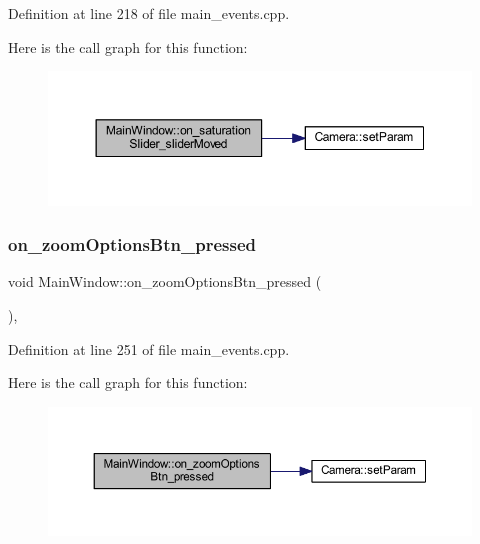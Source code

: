 Definition at line 218 of file main\+\_\+events.\+cpp.

Here is the call graph for this function\+:
\nopagebreak
\begin{figure}[H]
\begin{center}
\leavevmode
\includegraphics[width=350pt]{class_main_window_abd0b71ebb4667aa574bfa870ade22f58_cgraph}
\end{center}
\end{figure}
\mbox{\label{class_main_window_aaf176f5c10001cdcf845f1250232be9a}} 
\subsubsection{\texorpdfstring{on\_zoomOptionsBtn\_pressed}{on\_zoomOptionsBtn\_pressed}}
{\footnotesize\ttfamily void Main\+Window\+::on\+\_\+zoom\+Options\+Btn\+\_\+pressed (\begin{DoxyParamCaption}{ }\end{DoxyParamCaption})\hspace{0.3cm}{\ttfamily [private]}, {\ttfamily [slot]}}



Definition at line 251 of file main\+\_\+events.\+cpp.

Here is the call graph for this function\+:
\nopagebreak
\begin{figure}[H]
\begin{center}
\leavevmode
\includegraphics[width=350pt]{class_main_window_aaf176f5c10001cdcf845f1250232be9a_cgraph}
\end{center}
\end{figure}
\mbox{\label{class_main_window_a6ae3fbe8e4f3f10db4f2e0e495b98841}} 
